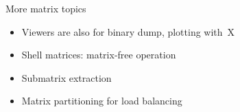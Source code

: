 \begin{shortversion}
\begin{numberedframe}{More matrix topics}
  \begin{itemize}
  \item Viewers are also for binary dump, plotting with~X
  \item Shell matrices: matrix-free operation
  \item Submatrix extraction
  \item Matrix partitioning for load balancing
  \end{itemize}
\end{numberedframe}

\end{shortversion}
